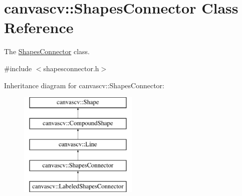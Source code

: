 \hypertarget{classcanvascv_1_1ShapesConnector}{}\section{canvascv\+:\+:Shapes\+Connector Class Reference}
\label{classcanvascv_1_1ShapesConnector}


The \hyperlink{classcanvascv_1_1ShapesConnector}{Shapes\+Connector} class.  




{\ttfamily \#include $<$shapesconnector.\+h$>$}

Inheritance diagram for canvascv\+:\+:Shapes\+Connector\+:\begin{figure}[H]
\begin{center}
\leavevmode
\includegraphics[height=5.000000cm]{classcanvascv_1_1ShapesConnector}
\end{center}
\end{figure}
